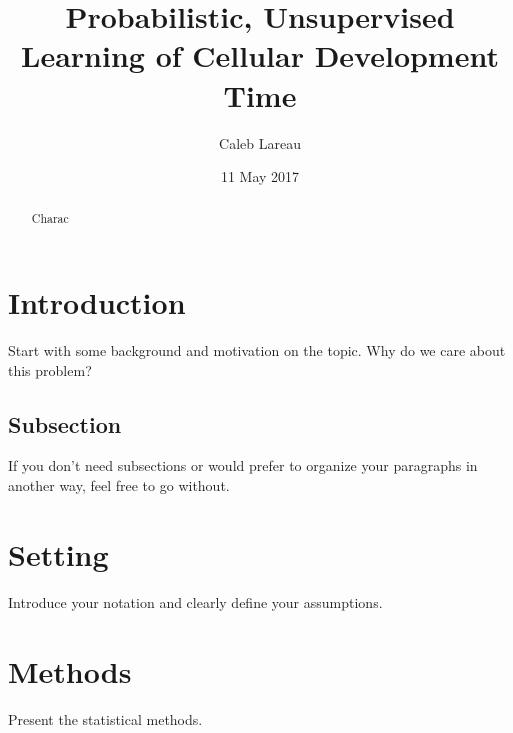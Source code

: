 \documentclass[english, 11pt]{article}
\begin{document}
\title{Probabilistic, Unsupervised Learning of Cellular Development Time}


\author{Caleb Lareau}


\date{11 May 2017}
\maketitle
\begin{abstract}
Charac

\newpage{}
\end{abstract}





\section{Introduction}

Start with some background and motivation on the topic. Why do we
care about this problem?


\subsection{Subsection }

If you don't need subsections or would prefer to organize your paragraphs
in another way, feel free to go without.




\section{Setting}

Introduce your notation and clearly define your assumptions. 







\section{Methods}

Present the statistical methods.
\end{document}
